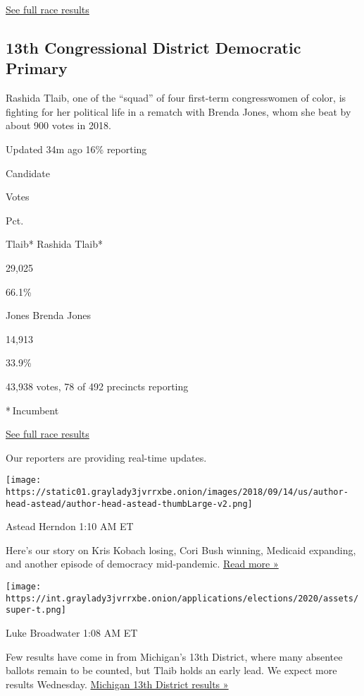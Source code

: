 \href{https://www.nytimes3xbfgragh.onion/interactive/2020/08/04/us/elections/results-michigan-house-district-6-primary-election.html}{See
full race results}

\hypertarget{13th-congressional-district-democratic-primary}{%
\subsection{13th Congressional District Democratic
Primary}\label{13th-congressional-district-democratic-primary}}

Rashida Tlaib, one of the ``squad'' of four first-term congresswomen of
color, is fighting for her political life in a rematch with Brenda
Jones, whom she beat by about 900 votes in 2018.

Updated 34m ago 16\% reporting

Candidate

Votes

Pct.

 Tlaib* Rashida Tlaib*

29,025

66.1\%

 Jones Brenda Jones

14,913

33.9\%

43,938 votes, 78 of 492 precincts reporting

* Incumbent

\href{https://www.nytimes3xbfgragh.onion/interactive/2020/08/04/us/elections/results-michigan-house-district-13-primary-election.html}{See
full race results}

Our reporters are providing real-time updates.

\texttt{[image: https://static01.graylady3jvrrxbe.onion/images/2018/09/14/us/author-head-astead/author-head-astead-thumbLarge-v2.png]}

Astead Herndon 1:10 AM ET

Here's our story on Kris Kobach losing, Cori Bush winning, Medicaid
expanding, and another episode of democracy mid-pandemic.
\href{https://www.nytimes3xbfgragh.onion/2020/08/04/us/politics/kobach-tlaib.html?action=click\&module=ELEX_results\&pgtype=Interactive\&region=ReporterUpdates}{Read
more »}

\texttt{[image: https://int.graylady3jvrrxbe.onion/applications/elections/2020/assets/super-t.png]}

Luke Broadwater 1:08 AM ET

Few results have come in from Michigan's 13th District, where many
absentee ballots remain to be counted, but Tlaib holds an early lead. We
expect more results Wednesday.
\href{https://www.nytimes3xbfgragh.onion/interactive/2020/08/04/us/elections/results-michigan-house-district-13-primary-election.html?action=click\&module=ELEX_results\&pgtype=Interactive\&region=ReporterUpdates}{Michigan
13th District results »}

